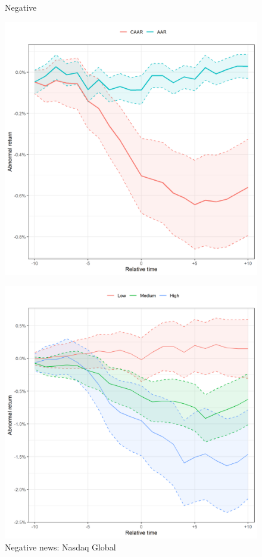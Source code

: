 \begin{figure}
     \centering
     \begin{minipage}[b]{0.49\textwidth}
         \centering
    \caption{Negative}
    \includegraphics[width=\textwidth]{Projekt/1.Figures analysis/ST_negative_all_CI_nasdaq.png}
     \label{fig:ST_neg_sensitivity_nasdaq}
     \end{minipage}
     \hfill
     \begin{minipage}[b]{0.49\textwidth}
       \centering
    \caption{Negative news: Nasdaq Global}
    \includegraphics[width=\textwidth]{Projekt/1.Figures analysis/ST_negative_ESG_nasdaq.png}

\end{minipage}
\end{figure}
